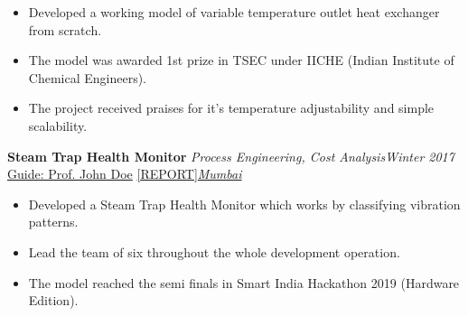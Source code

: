 \documentclass[10pt]{article}
\begin{document}
\begin{itemize}[itemsep = -0.75 mm, leftmargin=*]
    \item Developed a working model of variable temperature outlet heat exchanger from scratch.
    \item The model was awarded 1st prize in TSEC under IICHE (Indian Institute of Chemical Engineers).
    \item The project received praises for it's temperature adjustability and simple scalability.
\end{itemize}
\textbf{\large Steam Trap Health Monitor} \textemdash \textit{Process Engineering, Cost Analysis}\hfill{\sl \small Winter 2017}\\
 \href{https://johndoe.com}{Guide: Prof. John Doe}\hspace{10pt} \href{https://www.github.com/aovi14/process_sim}{[REPORT]}\hfill{\sl \small \href{https://www.mumbai.com}{Mumbai}}\\\vspace{-15pt}
\begin{itemize}[itemsep = -0.75 mm, leftmargin=*]
    \item Developed a Steam Trap Health Monitor which works by classifying vibration patterns.
    \item Lead the team of six throughout the whole development operation.
    \item The model reached the semi finals in Smart India Hackathon 2019 (Hardware Edition).
\end{itemize}
\vspace*{-3pt}
\end{document}
